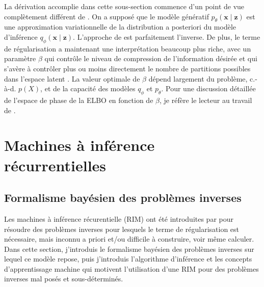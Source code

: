 La dérivation accomplie dans cette sous-section commence d'un point de vue complètement différent 
de \citet{Kingma2013}. On 
a supposé que le modèle génératif $p_\theta(\mathbf{x} \mid \mathbf{z})$ est une approximation variationnelle de 
la distribution a posteriori du modèle 
d'inférence $q_\phi(\mathbf{x} \mid \mathbf{z})$. L'approche de \citet{Kingma2013} est parfaitement l'inverse.
De plus, le terme de régularisation a maintenant une interprétation beaucoup plus riche, avec un paramètre 
$\beta$ qui contrôle le niveau de compression de l'information désirée et qui s'avère à contrôler plus ou moins 
directement le nombre de partitions possibles dans l'espace latent \citep{Alemi2017,Rezende2018}.
La valeur optimale de $\beta$ dépend largement du problème, c.-à-d. $p(X)$, et de 
la capacité des modèles $q_\phi$ et $p_\theta$. 
Pour une discussion détaillée de l'espace de phase de la ELBO en fonction de $\beta$, je réfère le lecteur 
au travail de \citet{Alemi2018}.


\section{Machines à inférence récurrentielles}\label{sec:intro rim}

\subsection{Formalisme bayésien des problèmes inverses}

Les machines à inférence récurentielle (RIM) ont été introduites par \citet{Putzky2017} pour résoudre des problèmes 
inverses pour lesquels le terme de régularisation est nécessaire, mais inconnu a priori et/ou difficile à 
construire, voir même calculer. Dans cette section, j'introduis le formalisme bayésien des problèmes inverses sur lequel 
ce modèle repose, puis j'introduis l'algorithme d'inférence et les concepts d'apprentissage machine qui motivent 
l'utilisation d'une RIM pour des problèmes inverses mal posés et sous-déterminés.

